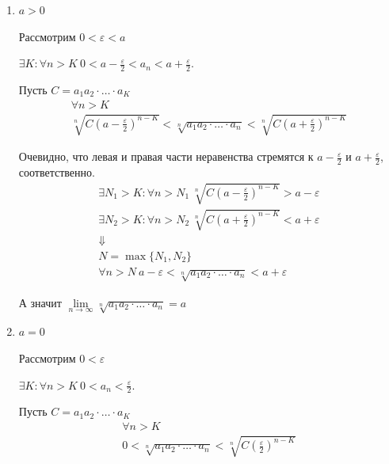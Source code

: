 \documentclass[14pt]{extarticle}
\numberwithin{equation}{section}
\begin{document}
    \begin{enumerate}
        \item
            \( a > 0 \)

            Рассмотрим \( 0 < \varepsilon < a \)

            \( \exists K : \forall n > K \ 0 < a - \frac{\varepsilon}{2} < a_n < a + \frac{\varepsilon}{2} \).

            Пусть \( C = a_1 a_2 \cdot \ldots \cdot a_K \)
            \begin{gather*}
                \forall n > K
                \\
                \sqrt[n]{C \left( a - \frac{\varepsilon}{2} \right)^{n - K}}
                    < \sqrt[n]{a_1 a_2 \cdot \ldots \cdot a_n}
                    < \sqrt[n]{C \left( a + \frac{\varepsilon}{2} \right)^{n - K}}
            \end{gather*}

            Очевидно, что левая и правая части неравенства стремятся к
            \( a - \frac{\varepsilon}{2} \) и \( a + \frac{\varepsilon}{2} \), соответственно.
            \begin{gather*}
                \exists N_1 > K : \forall n > N_1 \ \sqrt[n]{C \left( a - \frac{\varepsilon}{2} \right)^{n - K}} > a - \varepsilon
                \\
                \exists N_2 > K : \forall n > N_2 \ \sqrt[n]{C \left( a + \frac{\varepsilon}{2} \right)^{n - K}} < a + \varepsilon
                \\
                \Downarrow
                \\
                N = \max \{ N_1, N_2 \}
                \\
                \forall n > N \ a - \varepsilon < \sqrt[n]{a_1 a_2 \cdot \ldots \cdot a_n} < a + \varepsilon
            \end{gather*}

            А значит \( \lim\limits_{n \to \infty} \sqrt[n]{a_1 a_2 \cdot \ldots \cdot a_n} = a \)
        \item
            \( a = 0 \)

            Рассмотрим \( 0 < \varepsilon \)

            \( \exists K : \forall n > K \ 0 < a_n < \frac{\varepsilon}{2} \).

            Пусть \( C = a_1 a_2 \cdot \ldots \cdot a_K \)
            \begin{gather*}
                \forall n > K
                \\
                0 < \sqrt[n]{a_1 a_2 \cdot \ldots \cdot a_n}
                    < \sqrt[n]{C \left( \frac{\varepsilon}{2} \right)^{n - K}}
            \end{gather*}


\end{enumerate}
\end{document}
